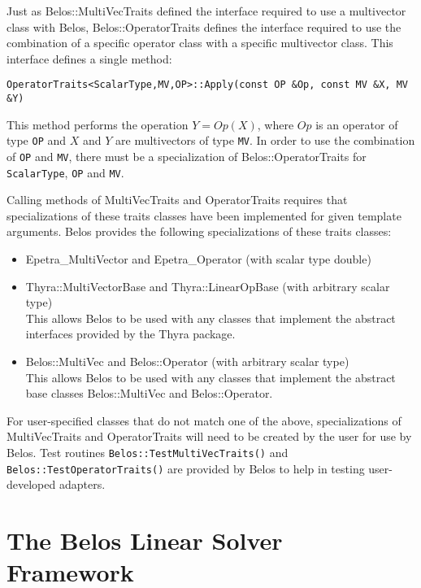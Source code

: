 Just as Belos::MultiVecTraits defined the interface required to use a
multivector class with Belos, Belos::OperatorTraits defines the
interface required to use the combination of a specific operator class with a
specific multivector class. This interface defines a single method:
\begin{verbatim}
OperatorTraits<ScalarType,MV,OP>::Apply(const OP &Op, const MV &X, MV &Y)
\end{verbatim}
This method performs the operation $Y = Op(X)$, where $Op$ is an operator of type
\verb!OP! and $X$ and $Y$ are multivectors of type \verb!MV!. In order to use the
combination of \verb!OP! and \verb!MV!, there must be a specialization of
Belos::OperatorTraits for \verb!ScalarType!, \verb!OP! and \verb!MV!. 

Calling methods of MultiVecTraits and OperatorTraits requires that specializations of
these traits classes have been implemented for given template arguments.  
Belos provides the following specializations of these traits classes:
\begin{itemize}
  \item Epetra\_MultiVector and Epetra\_Operator (with scalar type double)    
  \item Thyra::MultiVectorBase and Thyra::LinearOpBase (with arbitrary scalar type) \\
        This allows Belos to be used with any classes that implement the abstract interfaces provided by the Thyra package.    
  \item Belos::MultiVec and Belos::Operator (with arbitrary scalar type) \\
        This allows Belos to be used with any classes that implement the abstract base
        classes Belos::MultiVec and Belos::Operator.
\end{itemize}

For user-specified classes that do not match one of the above, specializations of
MultiVecTraits and OperatorTraits will need to be created by the user for use by Belos.
Test routines \verb!Belos::TestMultiVecTraits()! and
\verb!Belos::TestOperatorTraits()! are provided by Belos to help in testing
user-developed adapters.


\section{The Belos Linear Solver Framework}
\label{sec:belos:solver_framework}

